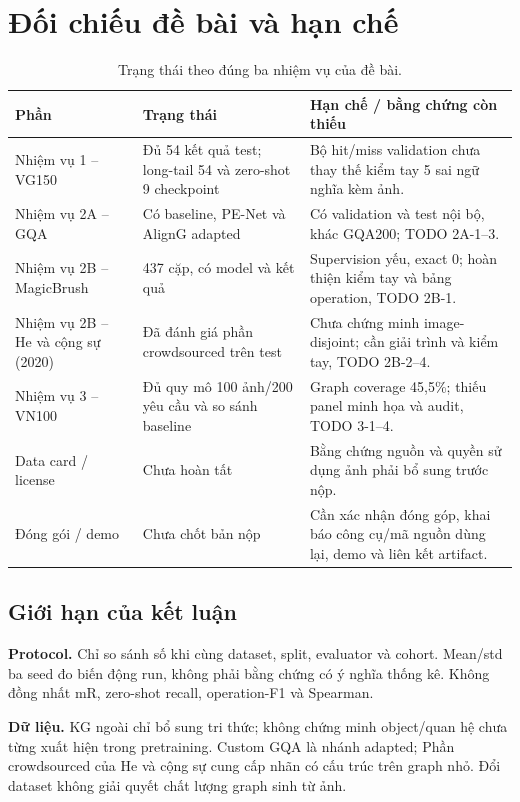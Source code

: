 
\section{Đối chiếu đề bài và hạn chế}
\begin{table}[!t]\centering\small
\caption{Trạng thái theo đúng ba nhiệm vụ của đề bài.}\label{tab:compliance}
\begin{tabularx}{\linewidth}{@{}p{35mm}p{43mm}X@{}}\toprule
Phần & Trạng thái & Hạn chế / bằng chứng còn thiếu\\\midrule
Nhiệm vụ 1 -- VG150 & Đủ 54 kết quả test; long-tail 54 và zero-shot 9 checkpoint & Bộ hit/miss validation chưa thay thế kiểm tay 5 sai ngữ nghĩa kèm ảnh.\\
Nhiệm vụ 2A -- GQA & Có baseline, PE-Net và AlignG adapted & Có validation và test nội bộ, khác GQA200; TODO 2A-1--3.\\
Nhiệm vụ 2B -- MagicBrush & 437 cặp, có model và kết quả & Supervision yếu, exact 0; hoàn thiện kiểm tay và bảng operation, TODO 2B-1.\\
Nhiệm vụ 2B -- He và cộng sự (2020) & Đã đánh giá phần crowdsourced trên test & Chưa chứng minh image-disjoint; cần giải trình và kiểm tay, TODO 2B-2--4.\\
Nhiệm vụ 3 -- VN100 & Đủ quy mô 100 ảnh/200 yêu cầu và so sánh baseline & Graph coverage 45,5\%; thiếu panel minh họa và audit, TODO 3-1--4.\\
Data card / license & Chưa hoàn tất & Bằng chứng nguồn và quyền sử dụng ảnh phải bổ sung trước nộp.\\
Đóng gói / demo & Chưa chốt bản nộp & Cần xác nhận đóng góp, khai báo công cụ/mã nguồn dùng lại, demo và liên kết artifact.\\
\bottomrule\end{tabularx}\end{table}

\subsection{Giới hạn của kết luận}
\textbf{Protocol.} Chỉ so sánh số khi cùng dataset, split, evaluator và cohort.
Mean/std ba seed đo biến động run, không phải bằng chứng có ý nghĩa thống kê.
Không đồng nhất mR, zero-shot recall, operation-F1 và Spearman.

\textbf{Dữ liệu.} KG ngoài chỉ bổ sung tri thức; không chứng minh object/quan hệ
chưa từng xuất hiện trong pretraining. Custom GQA là nhánh adapted;
Phần crowdsourced của He và cộng sự cung cấp nhãn có cấu trúc trên graph nhỏ. Đổi dataset không giải quyết
chất lượng graph sinh từ ảnh.

